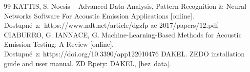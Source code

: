 \begin{thebibliography}{99}
KATTIS, S. Noesis – Advanced Data Analysis, Pattern Recognition \& Neural Networks Software For Acoustic Emission Applications [online].\\Dostupné~z:~https://www.ndt.net/article/dgzfp-ae-2017/papers/12.pdf 
CIABURRO, G. IANNACE, G. Machine-Learning-Based Methods for Acoustic Emission
Testing: A Review [online].\\ Dostupné~z: https://doi.org/10.3390/app122010476
DAKEL. ZEDO installation guide and user manual. 
ZD Rpety: DAKEL, [bez~data].
\end{thebibliography}


%
%
%
